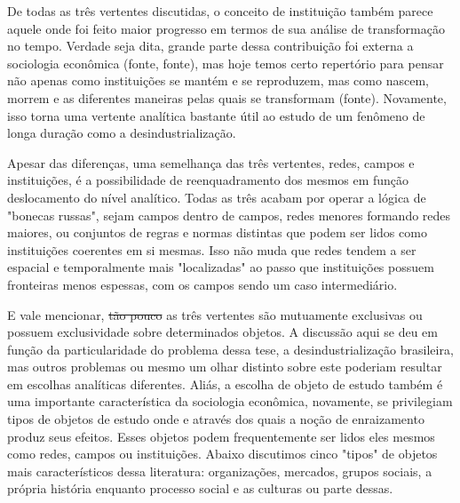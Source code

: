 De todas as três vertentes discutidas, o conceito de instituição também parece
aquele onde foi feito maior progresso em termos de sua análise de transformação no tempo. Verdade seja dita, grande parte dessa contribuição foi externa a sociologia econômica (fonte, fonte), mas hoje temos certo repertório para pensar não apenas como instituições
se mantém e se reproduzem, mas como nascem, morrem e as diferentes maneiras pelas quais se transformam (fonte). Novamente, isso torna uma vertente analítica bastante útil ao estudo de um fenômeno de longa duração como a desindustrialização.


Apesar das diferenças, uma semelhança das três vertentes, redes, campos e instituições, é a possibilidade de reenquadramento dos mesmos em função  deslocamento do nível analítico. Todas as três acabam por operar a lógica de "bonecas russas", sejam campos dentro de campos, redes menores formando redes maiores, ou conjuntos de regras e normas distintas que podem ser lidos como instituições coerentes em si mesmas. Isso não muda que redes tendem a ser espacial e temporalmente mais "localizadas" ao passo que instituições possuem fronteiras menos espessas, com os campos sendo um caso intermediário.

E vale mencionar, \sout{tão pouco} as três vertentes são mutuamente exclusivas ou possuem exclusividade sobre determinados objetos. A discussão aqui se deu em função da particularidade do problema dessa tese, a desindustrialização brasileira, mas outros problemas ou mesmo
um olhar distinto sobre este poderiam resultar em escolhas analíticas diferentes. Aliás, a escolha de objeto de estudo também é uma importante característica da sociologia econômica, novamente, se privilegiam tipos de objetos de estudo onde e através dos quais a noção de enraizamento produz seus efeitos. Esses objetos podem frequentemente ser lidos eles mesmos como redes, campos ou instituições. Abaixo discutimos cinco "tipos" de objetos mais característicos dessa literatura: organizações, mercados, grupos sociais, a própria história enquanto processo social e as culturas ou parte dessas.


